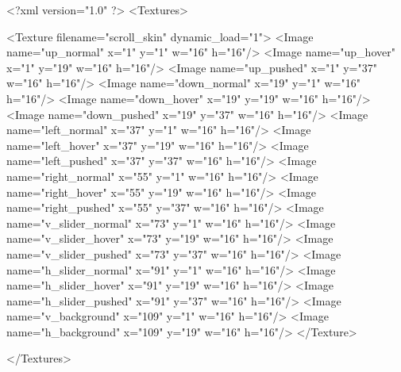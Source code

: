 <?xml version="1.0" ?>
<Textures>

	<Texture filename="scroll_skin" dynamic_load="1">
		<Image name="up_normal" x="1" y="1" w="16" h="16"/>
		<Image name="up_hover" x="1" y="19" w="16" h="16"/>
		<Image name="up_pushed" x="1" y="37" w="16" h="16"/>
		<Image name="down_normal" x="19" y="1" w="16" h="16"/>
		<Image name="down_hover" x="19" y="19" w="16" h="16"/>
		<Image name="down_pushed" x="19" y="37" w="16" h="16"/>
		<Image name="left_normal" x="37" y="1" w="16" h="16"/>
		<Image name="left_hover" x="37" y="19" w="16" h="16"/>
		<Image name="left_pushed" x="37" y="37" w="16" h="16"/>
		<Image name="right_normal" x="55" y="1" w="16" h="16"/>
		<Image name="right_hover" x="55" y="19" w="16" h="16"/>
		<Image name="right_pushed" x="55" y="37" w="16" h="16"/>
		<Image name="v_slider_normal" x="73" y="1" w="16" h="16"/>
		<Image name="v_slider_hover" x="73" y="19" w="16" h="16"/>
		<Image name="v_slider_pushed" x="73" y="37" w="16" h="16"/>
		<Image name="h_slider_normal" x="91" y="1" w="16" h="16"/>
		<Image name="h_slider_hover" x="91" y="19" w="16" h="16"/>
		<Image name="h_slider_pushed" x="91" y="37" w="16" h="16"/>
		<Image name="v_background" x="109" y="1" w="16" h="16"/>
		<Image name="h_background" x="109" y="19" w="16" h="16"/>
	</Texture>
	
</Textures>
